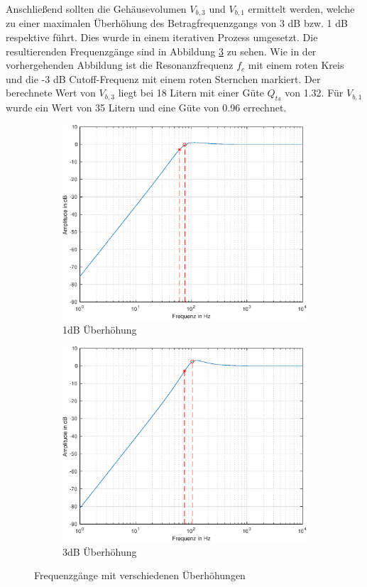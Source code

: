 Anschließend sollten die Gehäusevolumen $V_{b,3}$ und $V_{b,1}$ ermittelt werden, welche zu einer maximalen Überhöhung des Betragfrequenzgangs von 3 dB bzw. 1 dB respektive führt.
Dies wurde in einem iterativen Prozess umgesetzt.
Die resultierenden Frequenzgänge sind in Abbildung \ref{fig:Ueberhoehung} zu sehen.
Wie in der vorhergehenden Abbildung ist die Resonanzfrequenz $f_c$ mit einem roten Kreis und die -3 dB Cutoff-Frequenz mit einem roten Sternchen markiert.
Der berechnete Wert von $V_{b,3}$ liegt bei 18 Litern mit einer Güte $Q_{ts}$ von 1.32.
Für $V_{b,1}$ wurde ein Wert von 35 Litern und eine Güte von 0.96 errechnet.

\begin{figure}[H]
    \centering
    
    \begin{subfigure}{.49\textwidth}
        \centering
        \includegraphics[width=0.85\linewidth]{Figures/Frequenzgang_1dB.eps}
        \caption{1dB Überhöhung}
        \label{Frequenzgang_1dB}
    \end{subfigure}
    \begin{subfigure}{.49\textwidth}
        \centering
        \includegraphics[width=0.85\linewidth]{Figures/Frequenzgang_3dB.eps}
        \caption{3dB Überhöhung}
        \label{Frequenzgang_3dB}
    \end{subfigure}
    
    \caption{Frequenzgänge mit verschiedenen Überhöhungen}
    \label{fig:Ueberhoehung}
\end{figure}